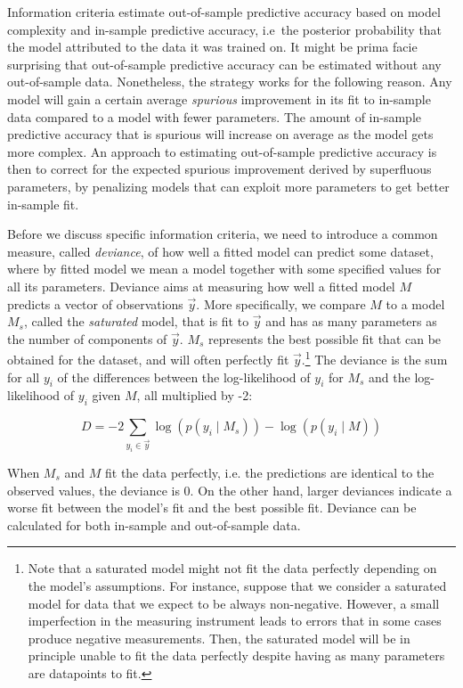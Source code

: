 \documentclass[a4paper,12pt,twoside]{article}
\begin{document}
Information criteria estimate out-of-sample predictive accuracy based on model complexity and in-sample predictive accuracy, i.e\ the posterior probability that the model attributed to the data it was trained on. It might be prima facie surprising that out-of-sample predictive accuracy can be estimated without any out-of-sample data. Nonetheless, the strategy works for the following reason. Any model will gain a certain average \textit{spurious} improvement in its fit to in-sample data compared to a model with fewer parameters. The amount of in-sample predictive accuracy that is spurious will increase on average as the model gets more complex. An approach to estimating out-of-sample predictive accuracy is then to correct for the expected spurious improvement derived by superfluous parameters, by penalizing models that can exploit more parameters to get better in-sample fit.

Before we discuss specific information criteria, we need to introduce a common measure, called \textit{deviance}, of how well a fitted model can predict some dataset, where by fitted model we mean a model together with some specified values for all its parameters. Deviance aims at measuring how well a fitted model $M$ predicts a vector of observations $\vec{y}$. More specifically, we compare $M$ to a model $M_s$, called the \textit{saturated} model, that is fit to $\vec{y}$ and has as many parameters as the number of components of $\vec{y}$. $M_s$ represents the best possible fit that can be obtained for the dataset, and will often perfectly fit $\vec{y}$.\footnote{Note that a saturated model might not fit the data perfectly depending on the model's assumptions. For instance, suppose that we consider a saturated model for data that we expect to be always non-negative. However, a small imperfection in the measuring instrument leads to errors that in some cases produce negative measurements. Then, the saturated model will be in principle unable to fit the data perfectly despite having as many parameters are datapoints to fit.} The deviance is the sum for all $y_i$ of the differences between the log-likelihood of $y_i$ for $M_s$ and the log-likelihood of $y_i$ given $M$, all multiplied by -2:

\begin{equation}
D = -2 \sum_{ y_i \in \vec{y}} \log(p( y_i \mid M_s )) - \log(p( y_i \mid M))
\end{equation}

When $M_s$ and $M$ fit the data perfectly, i.e. the predictions are identical to the observed values, the deviance is 0. On the other hand, larger deviances indicate a worse fit between the model's fit and the best possible fit. Deviance can be calculated for both in-sample and out-of-sample data. 
\end{document}
